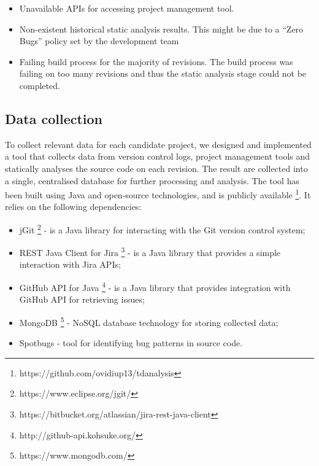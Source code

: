 \documentclass{mpaper}
\begin{document}
\begin{itemize}
  \item Unavailable APIs for accessing project management tool.
  \item Non-existent historical static analysis results. This might be due to a
  ``Zero Bugs'' policy set by the development team 
  \item Failing build process for the majority of revisions. The build process
  was failing on too many revisions and thus the static analysis stage could not
  be completed.
\end{itemize}

\subsection{Data collection}
\label{data-collection}

To collect relevant data for each candidate project, we designed and implemented
a tool that collects data from version control logs, project management tools
and statically analyses the source code on each revision. The result are
collected into a single, centralised database for further processing and
analysis. The tool has been built using Java and open-source technologies, and
is publicly available \footnote{https://github.com/ovidiup13/tdanalysis}. It
relies on the following dependencies:

\begin{itemize}
  \item jGit \footnote{https://www.eclipse.org/jgit/} - is a Java library for
  interacting with the Git version control system;
  \item REST Java Client for Jira
  \footnote{https://bitbucket.org/atlassian/jira-rest-java-client} - is a Java
  library that provides a simple interaction with Jira APIs;
  \item GitHub API for Java \footnote{http://github-api.kohsuke.org/} - is a
  Java library that provides integration with GitHub API for retrieving issues;
  \item MongoDB \footnote{https://www.mongodb.com/} - NoSQL database technology
  for storing collected data;
  \item Spotbugs - tool for identifying bug patterns in source code.
\end{itemize}
\end{document}
